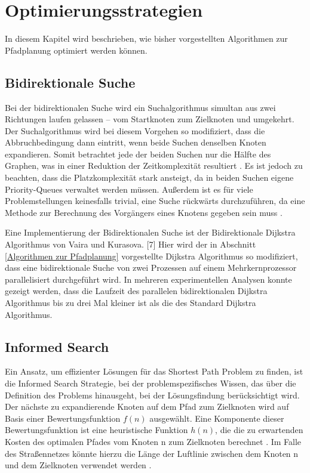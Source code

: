 \chapter{Optimierungsstrategien}

In diesem Kapitel wird beschrieben, wie bisher vorgestellten Algorithmen zur Pfadplanung optimiert werden können.

\section{Bidirektionale Suche}

Bei der bidirektionalen Suche wird ein Suchalgorithmus simultan aus zwei Richtungen laufen gelassen – vom Startknoten zum Zielknoten und umgekehrt. Der Suchalgorithmus wird bei diesem Vorgehen so modifiziert, dass die Abbruchbedingung dann eintritt, wenn beide Suchen denselben Knoten expandieren. Somit betrachtet jede der beiden Suchen nur die Hälfte des Graphen, was in einer Reduktion der Zeitkomplexität resultiert \cite{Russell2010}. Es ist jedoch zu beachten, dass die Platzkomplexität stark ansteigt, da in beiden Suchen eigene Priority-Queues verwaltet werden müssen. Außerdem ist es für viele Problemstellungen keinesfalls trivial, eine Suche rückwärts durchzuführen, da eine Methode zur Berechnung des Vorgängers eines Knotens gegeben sein muss \cite{Russell2010}.

Eine Implementierung der Bidirektionalen Suche ist der Bidirektionale Dijkstra Algorithmus von Vaira und Kurasova. [7] Hier wird der in Abschnitt \ref{Algorithmen zur Pfadplanung} vorgestellte Dijkstra Algorithmus so modifiziert, dass eine bidirektionale Suche von zwei Prozessen auf einem Mehrkernprozessor parallelisiert durchgeführt wird. In mehreren experimentellen Analysen konnte gezeigt werden, dass die Laufzeit des parallelen bidirektionalen Dijkstra Algorithmus bis zu drei Mal kleiner ist als die des Standard Dijkstra Algorithmus.

\section{Informed Search}
Ein Ansatz, um effizienter Lösungen für das Shortest Path Problem zu finden, ist die Informed Search Strategie, bei der problemspezifisches Wissen, das über die Definition des Problems hinausgeht, bei der Lösungsfindung berücksichtigt wird. Der nächste zu expandierende Knoten auf dem Pfad zum Zielknoten wird auf Basis einer Bewertungsfunktion $f(n)$ ausgewählt. Eine Komponente dieser Bewertungsfunktion ist eine heuristische Funktion $h(n)$, die die zu erwartenden Kosten des optimalen Pfades vom Knoten n zum Zielknoten berechnet \cite{Russel2010}. Im Falle des Straßennetzes könnte hierzu die Länge der Luftlinie zwischen dem Knoten n und dem Zielknoten verwendet werden \cite{Hart1968}.

